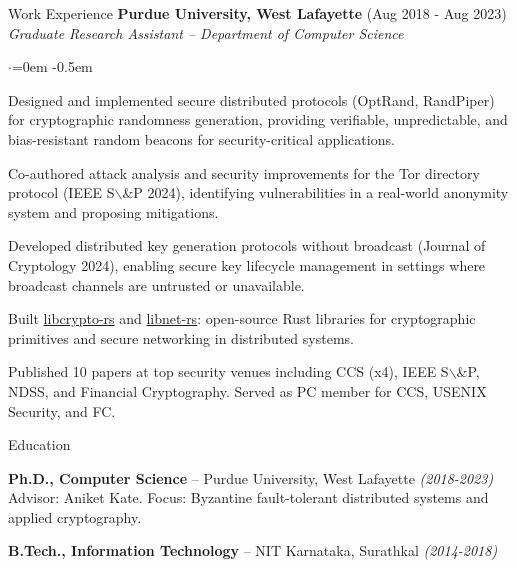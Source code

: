 \documentclass{resume}
\begin{document}
\begin{rSection}{Work Experience}
\textbf{Purdue University, West Lafayette}  \hfill  (Aug 2018 - Aug 2023)\\
\emph{Graduate Research Assistant -- Department of Computer Science}
\begin{list}{$\cdot$}{\leftmargin=0em}
\itemsep -0.5em \vspace{-0.5em}
 \item  Designed and implemented secure distributed protocols (OptRand, RandPiper) for cryptographic randomness generation, providing verifiable, unpredictable, and bias-resistant random beacons for security-critical applications.
 \item  Co-authored attack analysis and security improvements for the Tor directory protocol (IEEE S$\backslash$&P 2024), identifying vulnerabilities in a real-world anonymity system and proposing mitigations.
 \item  Developed distributed key generation protocols without broadcast (Journal of Cryptology 2024), enabling secure key lifecycle management in settings where broadcast channels are untrusted or unavailable.
 \item  Built \href{https://github.com/libdist-rs/libcrypto-rs}{libcrypto-rs} and \href{https://github.com/libdist-rs/libnet-rs}{libnet-rs}: open-source Rust libraries for cryptographic primitives and secure networking in distributed systems.
 \item  Published 10 papers at top security venues including CCS (x4), IEEE S$\backslash$&P, NDSS, and Financial Cryptography. Served as PC member for CCS, USENIX Security, and FC.
\end{list}
\vspace{0.5em}
\end{rSection}
\begin{rSection}{Education}
\label{sec:org19818d0}
 \item  \textbf{Ph.D., Computer Science} -- Purdue University, West Lafayette  \hfill  \emph{(2018-2023)}\\
    Advisor: Aniket Kate. Focus: Byzantine fault-tolerant distributed systems and applied cryptography.

 \item  \textbf{B.Tech., Information Technology} -- NIT Karnataka, Surathkal  \hfill  \emph{(2014-2018)}
\end{rSection}
\end{document}
